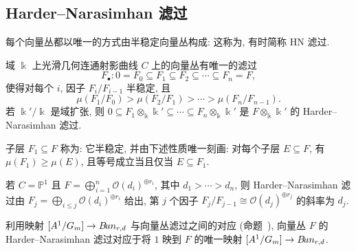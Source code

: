 \subsection{Harder--Narasimhan 滤过}\label{src:9.1.3-subsection}
每个向量丛都以唯一的方式由半稳定向量丛构成: 这称为, 有时简称 HN 滤过.
\begin{theorem}\label{src:9.1.21}
域 $\Bbbk$ 上光滑几何连通射影曲线 $C$ 上的向量丛有唯一的滤过
\[
F_\bullet:0=F_0\subseteq F_1\subseteq F_2\subseteq\cdots\subseteq F_n=F,
\]
使得对每个 $i$, 因子 $F_i/F_{i-1}$ 半稳定, 且
\[
\mu(F_1/F_0)>\mu(F_2/F_1)>\cdots>\mu(F_n/F_{n-1}).
\]
若 $\Bbbk'/\Bbbk$ 是域扩张, 则 $0\subseteq F_1\otimes_{\Bbbk}\Bbbk'\subseteq\cdots\subseteq F_n\otimes_{\Bbbk}\Bbbk'$ 是 $F\otimes_{\Bbbk}\Bbbk'$ 的 Harder--Narasimhan 滤过.
\end{theorem}
\begin{remark}\label{src:9.1.22}
子层 $F_1\subseteq F$ 称为: 它半稳定, 并由下述性质唯一刻画: 对每个子层 $E\subseteq F$, 有 $\mu(F_1)\geq\mu(E)$, 且等号成立当且仅当 $E\subseteq F_1$.
\end{remark}
\begin{remark}\label{src:9.1.23}
若 $C=\mathbb P^1$ 且 $F=\bigoplus_{i=1}^n\mathcal O(d_i)^{\oplus r_i}$, 其中 $d_1>\cdots>d_n$, 则 Harder--Narasimhan 滤过由 $F_j=\bigoplus_{i\leq j}\mathcal O(d_i)^{\oplus r_i}$ 给出, 第 $j$ 个因子 $F_j/F_{j-1}\cong\mathcal O(d_j)^{\oplus r_j}$ 的斜率为 $d_j$.
\end{remark}
\begin{remark}\label{src:9.1.24}
利用映射 $[A^1/G_m]\to B\!un_{r,d}$ 与向量丛滤过之间的对应 (命题~), 向量丛 $F$ 的 Harder--Narasimhan 滤过对应于将 $1$ 映到 $F$ 的唯一映射 $[A^1/G_m]\to B\!un_{r,d}$.
\end{remark}
